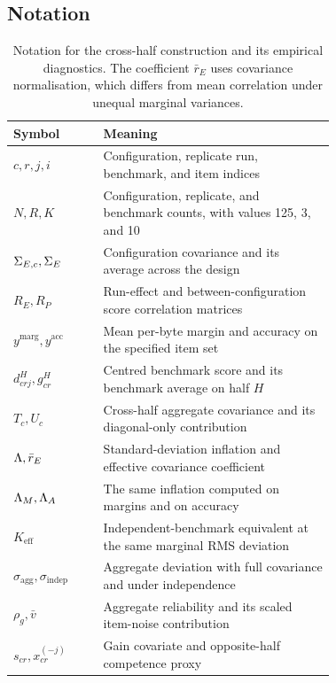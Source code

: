 \subsection{Notation}
\begin{table}[h]
\centering
\caption{Notation for the cross-half construction and its empirical diagnostics. The coefficient $\bar r_E$ uses covariance normalisation, which differs from mean correlation under unequal marginal variances.}\label{tab:notation}
\small\setlength{\tabcolsep}{4pt}\renewcommand{\arraystretch}{1.12}
\begin{tabular}{lL{0.72\linewidth}}
\toprule
Symbol & Meaning\\
\midrule
$c,r,j,i$ & Configuration, replicate run, benchmark, and item indices\\
$N,R,K$ & Configuration, replicate, and benchmark counts, with values 125, 3, and 10\\
$\Sigma_{E,c},\Sigma_E$ & Configuration covariance and its average across the design\\
$R_E,R_P$ & Run-effect and between-configuration score correlation matrices\\
$y^{\mathrm{marg}},y^{\mathrm{acc}}$ & Mean per-byte margin and accuracy on the specified item set\\
$d^H_{crj},g^H_{cr}$ & Centred benchmark score and its benchmark average on half $H$\\
$T_c,U_c$ & Cross-half aggregate covariance and its diagonal-only contribution\\
$\Lambda,\bar r_E$ & Standard-deviation inflation and effective covariance coefficient\\
$\Lambda_M,\Lambda_A$ & The same inflation computed on margins and on accuracy\\
$K_{\mathrm{eff}}$ & Independent-benchmark equivalent at the same marginal RMS deviation\\
$\sigma_{\mathrm{agg}},\sigma_{\mathrm{indep}}$ & Aggregate deviation with full covariance and under independence\\
$\rho_g,\bar v$ & Aggregate reliability and its scaled item-noise contribution\\
$s_{cr},x_{cr}^{(-j)}$ & Gain covariate and opposite-half competence proxy\\
\bottomrule
\end{tabular}
\end{table}

